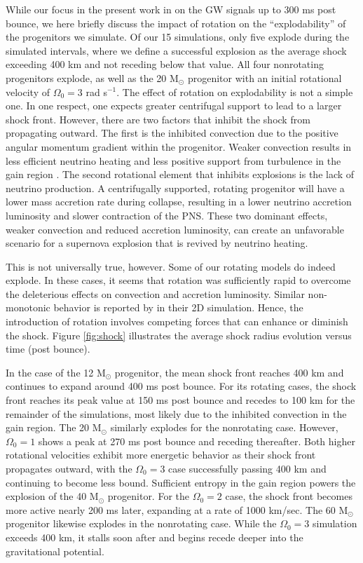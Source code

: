 \documentclass[twocolumn,times]{aastex62}  %
\newcommand{\Msun}{\ensuremath{\mathrm{M}_\odot}\xspace}
\begin{document}
While our focus in the present work in on the GW signals up to 300 ms post bounce, we here briefly discuss the impact of rotation on the ``explodability'' of the progenitors we simulate.   
Of our 15 simulations, only five explode during the simulated intervals, where we define a successful explosion as the average shock exceeding 400 km and not receding below that value.  All four nonrotating progenitors explode, as well as the 20 \Msun progenitor with an initial rotational velocity of $\Omega_0 = 3$ rad s$^{-1}$.  
The effect of rotation on explodability is not a simple one. 
In one respect, one expects greater centrifugal support to lead to a larger shock front.  However, there are two factors that inhibit the shock from propagating outward.  The first is the inhibited convection due to the positive angular momentum gradient within the progenitor. Weaker convection results in less efficient neutrino heating \citep{dolence:2013, murphy:2013} and less positive support from turbulence in the gain region \citep{couch:2015a, mabanta:2018}.  The  second rotational element that inhibits explosions is the lack of neutrino production.  A centrifugally supported, rotating progenitor will have a lower mass accretion rate during collapse, resulting in a lower neutrino accretion luminosity and slower contraction of the PNS. 
These two dominant effects, weaker convection and reduced accretion luminosity, can create an unfavorable scenario for a supernova explosion that is revived by neutrino heating.

This is not universally true, however. 
Some of our rotating models do indeed explode. 
In these cases, it seems that rotation was sufficiently rapid to overcome the deleterious effects on convection and accretion luminosity.
Similar non-monotonic behavior is reported by \citet{summa:2018} in their 2D simulation.
Hence, the introduction of rotation involves competing forces that can enhance or diminish the shock.  Figure \ref{fig:shock} illustrates the average shock radius evolution versus time (post bounce).

In the case of the 12 \Msun progenitor, the mean shock front reaches 400 km and continues to expand around 400 ms post bounce.  For its rotating cases, the shock front reaches its peak value at 150 ms post bounce and recedes to 100 km for the remainder of the simulations, most likely due to the inhibited convection in the gain region.  The 20 \Msun similarly explodes for the nonrotating case.  However, $\Omega_0 = 1$ shows a peak at 270 ms post bounce and receding thereafter.  Both higher rotational velocities exhibit more energetic behavior as their shock front propagates outward, with the $\Omega_0 = 3$ case successfully passing 400 km and continuing to become less bound.  Sufficient entropy in the gain region powers the explosion of the 40 \Msun progenitor.  For the $\Omega_0 = 2$ case, the shock front becomes more active nearly 200 ms later, expanding at a rate of 1000 km/sec.  The 60 \Msun progenitor likewise explodes in the nonrotating case.  While the $\Omega_0 = 3$ simulation exceeds 400 km, it stalls soon after and begins recede deeper into the gravitational potential.  
\end{document}
